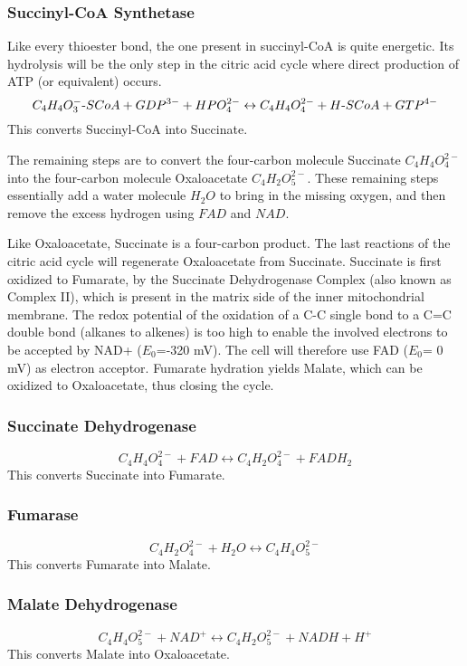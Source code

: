 \documentclass{article}
\def\mhyphen{{\hbox{-}}}
\begin{document}
\subsubsection{Succinyl-CoA Synthetase}
Like every thioester bond, the one present in succinyl-CoA is quite energetic. Its
hydrolysis will be the only step in the citric acid cycle where direct production of ATP
(or equivalent) occurs.
\[
    C_4H_4O_3^{-}{\mhyphen}SCoA + GDP^{3-} + HPO_4^{2-} \leftrightarrow
    C_4H_4O_4^{2-} + H{\mhyphen}SCoA + GTP^{4-}
\]
This converts Succinyl-CoA into Succinate.

The remaining steps are to convert the four-carbon molecule Succinate $C_4H_4O_4^{2-}$
into the four-carbon molecule Oxaloacetate $C_4H_2O_5^{2-}$. These remaining steps
essentially add a water molecule $H_2O$ to bring in the missing oxygen, and then remove
the excess hydrogen using $FAD$ and $NAD$.

Like Oxaloacetate, Succinate is a four-carbon product. The last reactions of the citric
acid cycle will regenerate Oxaloacetate from Succinate. Succinate is first oxidized to
Fumarate, by the Succinate Dehydrogenase Complex (also known as Complex II), which is
present in the matrix side of the inner mitochondrial membrane. The redox potential of the
oxidation of a C-C single bond to a C=C double bond (alkanes to alkenes) is too high to
enable the involved electrons to be accepted by NAD+ ($E_0$=-320 mV). The cell will therefore
use FAD ($E_0$= 0 mV) as electron acceptor. Fumarate hydration yields Malate, which can be
oxidized to Oxaloacetate, thus closing the cycle.

\subsubsection{Succinate Dehydrogenase}
\[
    C_4H_4O_4^{2-} + FAD \leftrightarrow C_4H_2O_4^{2-} + FADH_2
\]
This converts Succinate into Fumarate.

\subsubsection{Fumarase}
\[
    C_4H_2O_4^{2-} + H_2O \leftrightarrow C_4H_4O_5^{2-}
\]
This converts Fumarate into Malate.

\subsubsection{Malate Dehydrogenase}\label{sec_malate_dehydrogenase}
\[
    C_4H_4O_5^{2-} + NAD^+ \leftrightarrow C_4H_2O_5^{2-} + NADH + H^+
\]
This converts Malate into Oxaloacetate.
\end{document}
